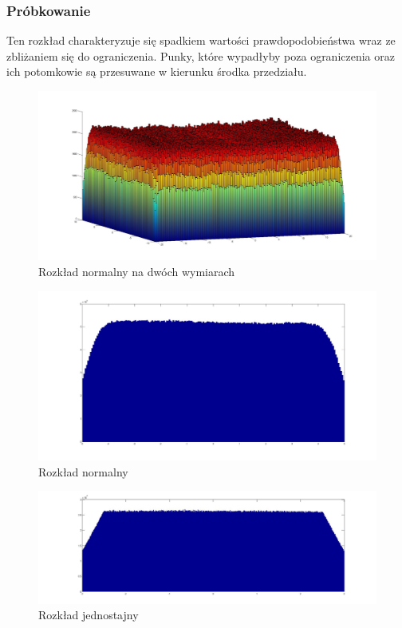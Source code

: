 \documentclass{mini}
\begin{document}
\subsubsection*{Próbkowanie}
Ten rozkład charakteryzuje się spadkiem wartości prawdopodobieństwa wraz ze zbliżaniem się do ograniczenia. Punky, które wypadłyby poza ograniczenia oraz ich potomkowie są przesuwane w kierunku środka przedziału.

\begin{figure}[H]
\centering
\includegraphics[width=\textwidth]{s_n_10M_2__20_20__10_10_4_2}
\caption{Rozkład normalny na dwóch wymiarach}
\end{figure}

\begin{figure}[H]
\centering
\includegraphics[width=\textwidth]{s_n_10M_1__5_5}
\caption{Rozkład normalny}
\end{figure}

\begin{figure}[H]
\centering
\includegraphics[width=\textwidth]{s_j_20M_1__3_3}
\caption{Rozkład jednostajny}
\label{bladzenie:probkowanie1dj}
\end{figure}
\end{document}
